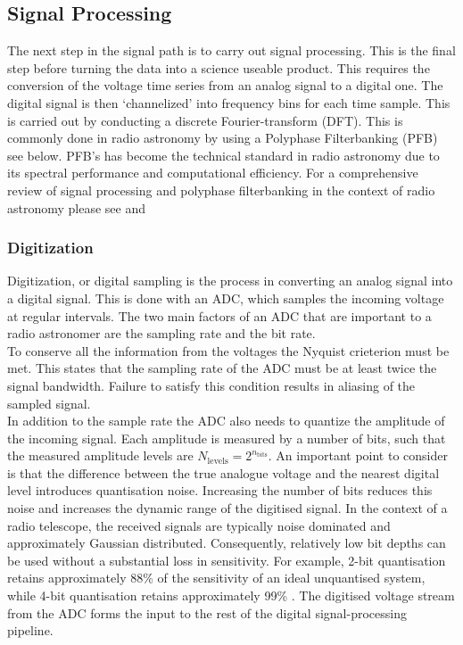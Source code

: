 \subsection{Signal Processing}
\label{sec:chap2signalprocessing}

The next step in the signal path is to carry out signal processing. This is the final step before turning the data into a science useable product. This requires the conversion of the voltage time series from an analog signal to a digital one. The digital signal is then `channelized' into frequency bins for each time sample. This is carried out by conducting a discrete Fourier-transform (DFT). This is commonly done in radio astronomy by using a Polyphase Filterbanking (PFB) see below. PFB's has become the technical standard in radio astronomy due to its spectral performance and computational efficiency. For a comprehensive review of signal processing and polyphase filterbanking in the context of radio astronomy please see \citet[chap. 4,][]{WilsonToolsofRadioastron} and \cite{price_spectrometers_2018}

\subsubsection{Digitization}

Digitization, or digital sampling is the process in converting an analog signal into a digital signal. This is done with an ADC, which samples the incoming voltage at regular intervals. The two main factors of an ADC that are important to a radio astronomer are the sampling rate and the bit rate. \\ 
To conserve all the information from the voltages the Nyquist crieterion must be met. This states that the sampling rate of the ADC must be at least twice the signal bandwidth. Failure to satisfy this condition results in aliasing of the sampled signal. \\ 
In addition to the sample rate the ADC also needs to quantize the amplitude of the incoming signal. Each amplitude is measured by a number of bits, such that the measured amplitude levels are $N_{\text{levels}} = 2^{n_\text{bits}}$. An important point to consider is that the difference between the true analogue voltage and the nearest digital level introduces quantisation noise. Increasing the number of bits reduces this noise and increases the dynamic range of the digitised signal. In the context of a radio telescope, the received signals are typically noise dominated and approximately Gaussian distributed. Consequently, relatively low bit depths can be used without a substantial loss in sensitivity. For example, 2-bit quantisation retains approximately 88\% of the sensitivity of an ideal unquantised system, while 4-bit quantisation retains approximately 99\% \citep{thompson_convenient_2007}. The digitised voltage stream from the ADC forms the input to the rest of the digital signal-processing pipeline. 


